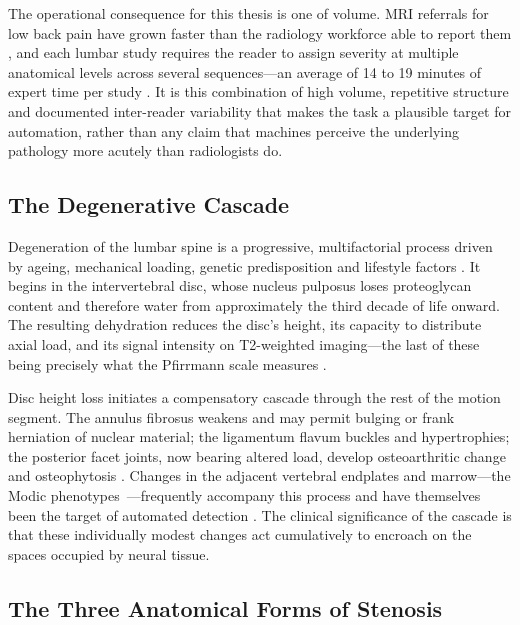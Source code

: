 The operational consequence for this thesis is one of volume. MRI referrals for
low back pain have grown faster than the radiology workforce able to report
them \cite{ghosh2014supervised,compte2023are}, and each lumbar study requires
the reader to assign severity at multiple anatomical levels across several
sequences---an average of 14 to 19 minutes of expert time per study
\cite{compte2023are}. It is this combination of high volume, repetitive
structure and documented inter-reader variability that makes the task a
plausible target for automation, rather than any claim that machines perceive
the underlying pathology more acutely than radiologists do.

\subsection{The Degenerative Cascade}
\label{sec:lr-cascade}

Degeneration of the lumbar spine is a progressive, multifactorial process
driven by ageing, mechanical loading, genetic predisposition and lifestyle
factors \cite{esposito2025mribased,zhao2025advances}. It begins in the
intervertebral disc, whose nucleus pulposus loses proteoglycan content and
therefore water from approximately the third decade of life onward. The
resulting dehydration reduces the disc's height, its capacity to distribute
axial load, and its signal intensity on T2-weighted imaging---the last of these
being precisely what the Pfirrmann scale measures \cite{pfirrmann2001magnetic}.

Disc height loss initiates a compensatory cascade through the rest of the motion
segment. The annulus fibrosus weakens and may permit bulging or frank herniation
of nuclear material; the ligamentum flavum buckles and hypertrophies; the
posterior facet joints, now bearing altered load, develop osteoarthritic change
and osteophytosis \cite{bharadwaj2023deep,nikpasand2024automated}. Changes in
the adjacent vertebral endplates and marrow---the Modic
phenotypes~\cite{modic1988degenerative}---frequently accompany this process and
have themselves been the target of automated detection
\cite{gao2022automatic,athertya2021classification}. The clinical significance of
the cascade is that these individually modest changes act cumulatively to
encroach on the spaces occupied by neural tissue.

\subsection{The Three Anatomical Forms of Stenosis}
\label{sec:lr-stenosis-types}

